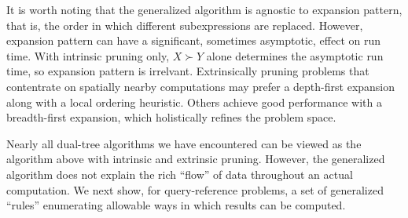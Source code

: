 \documentclass[twoside,leqno,twocolumn]{article}
\newcommand{\otimeshat}{\widehat{\otimes}}
\newcommand{\odothat}{\widehat{\odot}}
\newcommand{\prefsplit}[2]{#1 \succ #2}
\newcommand{\summary}{\hat{\sigma}}
\newcommand{\gnp}{\psi}
\newcommand{\kdroot}[1]{#1^{\text{root}}}
\newcommand{\outstat}{\sigma}
\begin{document}


It is worth noting that the generalized algorithm is agnostic to expansion pattern, that is, the order in which different subexpressions are replaced.
However, expansion pattern can have a significant, sometimes asymptotic, effect on run time.
With intrinsic pruning only, $\prefsplit{X}{Y}$ alone determines the asymptotic run time, so expansion pattern is irrelvant.
Extrinsically pruning problems that contentrate on spatially nearby computations may prefer a depth-first expansion along with a local ordering heuristic.
Others achieve good performance with a breadth-first expansion, which holistically refines the problem space.

Nearly all dual-tree algorithms we have encountered can be viewed as the algorithm above with intrinsic and extrinsic pruning.
However, the generalized algorithm does not explain the rich ``flow'' of data throughout an actual computation.
We next show, for query-reference problems, a set of generalized ``rules'' enumerating allowable ways in which results can be computed.
\end{document}
